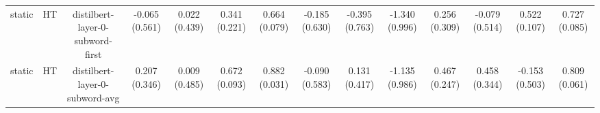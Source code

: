 \begin{sidewaystable}[htb]
\begin{tabular}{@{}cccccccccccccc@{}}
        static & HT & distilbert-layer-0-subword-first & -0.065 (0.561) & 0.022 (0.439) & 0.341 (0.221) & 0.664 (0.079) & -0.185 (0.630) & -0.395 (0.763) & -1.340 (0.996) & 0.256 (0.309) & -0.079 (0.514) & 0.522 (0.107) & 0.727 (0.085) \\
        static & HT & distilbert-layer-0-subword-avg & 0.207 (0.346) & 0.009 (0.485) & 0.672 (0.093) & 0.882 (0.031) & -0.090 (0.583) & 0.131 (0.417) & -1.135 (0.986) & 0.467 (0.247) & 0.458 (0.344) & -0.153 (0.503) & 0.809 (0.061) \\
        \bottomrule
    \end{tabular}
\end{sidewaystable}